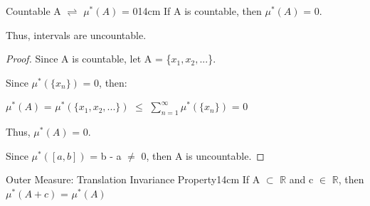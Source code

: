     \vspace{0.5cm}



    \begin{corollary}{Countable A $\rightleftharpoons$ $\mu^*(A)$ = 0}{14cm}
        If A is countable, then $\mu^*(A)$ = 0.

        Thus, intervals are uncountable.
    \end{corollary}

    \begin{proof}
        Since A is countable, let A = \{$x_1,x_2,...$\}.
        
        Since $\mu^*(\{x_n\})$ = 0, then:
        
        \hspace{0.5cm}
        $\mu^*(A)$
        = $\mu^*(\{x_1,x_2,...\})$
        $\leq$ $\sum_{n=1}^{\infty} \mu^*(\{x_n\})$
        = 0

        Thus, $\mu^*(A)$ = 0.

        Since $\mu^*([a,b])$ = b - a $\not =$ 0, then A is uncountable. 
    \end{proof}

    \vspace{0.5cm}



    \begin{wtheorem}{Outer Measure: Translation Invariance Property}{14cm}
        If A $\subset$ $\mathbb{R}$ and c $\in$ $\mathbb{R}$, then
        $\mu^*(A+c)$ = $\mu^*(A)$
    \end{wtheorem}

